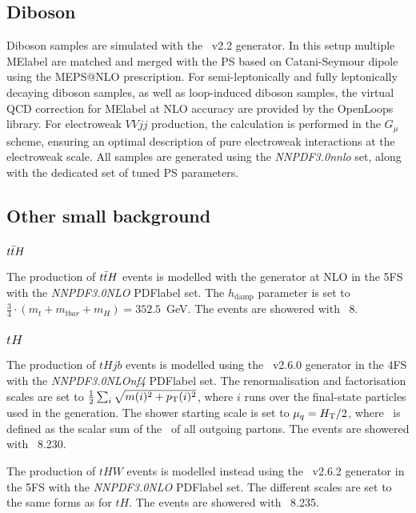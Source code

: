 \subsection{Diboson}
Diboson samples are simulated with the \SHERPA~v2.2 generator. In this setup multiple \acrshort{MElabel} are matched and merged with the \SHERPA PS based on Catani-Seymour dipole using the MEPS@NLO prescription. For semi-leptonically and fully leptonically decaying diboson samples, as well as loop-induced diboson samples, the virtual QCD correction for \acrshort{MElabel} at NLO accuracy are provided by the OpenLoops library. For electroweak $VVjj$ production, the calculation is performed in the $G_\mu$ scheme, ensuring an optimal description of pure electroweak interactions at the electroweak scale. All samples are generated using
the \textit{NNPDF3.0nnlo} set, along with the dedicated set of tuned PS parameters.

\subsection{Other small background}

\subsubsection{$t\bar{t} H$}
The production of $t\bar{t} H$ events is modelled with the \POWHEGBOX generator at NLO in the 5FS with the \textit{NNPDF3.0NLO} \acrshort{PDFlabel} set. The $h_\text{damp}$ parameter is set to $\frac{3}{4}\cdot(m_t + m_{tbar} + m_H ) = 352.5$~GeV. The events are showered with \PYTHIA~8.%

\subsubsection{$tH$}
The production of $tHjb$ events is modelled using the \MGMCatNLO~v2.6.0 generator in the 4FS with the \textit{NNPDF3.0NLOnf4} \acrshort{PDFlabel} set. The renormalisation and factorisation scales are set to $\frac{1}{2}\sum_i\sqrt{m(i)^2+p_{\text{T}}(i)^2}$, where $i$ runs over the final-state particles used in the generation. The shower starting scale is set to $\mu_q = H_{\text{T}} /2$, where \HT\ is defined as the scalar sum of the \pT\
of all outgoing partons. The events are showered with \PYTHIA~8.230.

The production of $tHW$ events is modelled instead using the \MGMCatNLO~v2.6.2 generator in the 5FS with the \textit{NNPDF3.0NLO} \acrshort{PDFlabel} set. The different scales are set to the same forms as for $tH$. The events are showered with \PYTHIA~8.235.

